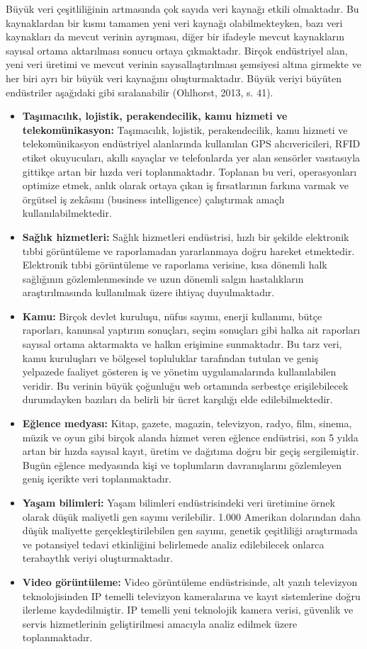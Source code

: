 \documentclass[12pt,twoside]{deuthesis}
\begin{document}
Büyük veri çeşitliliğinin artmasında çok sayıda veri kaynağı etkili olmaktadır. Bu kaynaklardan bir kısmı tamamen yeni veri kaynağı olabilmekteyken, bazı veri kaynakları da mevcut verinin ayrışması, diğer bir ifadeyle mevcut kaynakların sayısal ortama aktarılması sonucu ortaya çıkmaktadır. Birçok endüstriyel alan, yeni veri üretimi ve mevcut verinin sayısallaştırılması şemsiyesi altına girmekte ve her biri ayrı bir büyük veri kaynağını oluşturmaktadır. Büyük veriyi büyüten endüstriler aşağıdaki gibi sıralanabilir (Ohlhorst, 2013, s. 41).
\begin{itemize}
\item
  \textbf{Taşımacılık, lojistik, perakendecilik, kamu hizmeti ve telekomünikasyon:} Taşımacılık, lojistik, perakendecilik, kamu hizmeti ve telekomünikasyon endüstriyel alanlarında kullanılan GPS alıcıvericileri, RFID etiket okuyucuları, akıllı sayaçlar ve telefonlarda yer alan sensörler vasıtasıyla gittikçe artan bir hızda veri toplanmaktadır. Toplanan bu veri, operasyonları optimize etmek, anlık olarak ortaya çıkan iş fırsatlarının farkına varmak ve örgütsel iş zekâsını (business intelligence) çalıştırmak amaçlı kullanılabilmektedir.
\item
  \textbf{Sağlık hizmetleri:} Sağlık hizmetleri endüstrisi, hızlı bir şekilde elektronik tıbbi görüntüleme ve raporlamadan yararlanmaya doğru hareket etmektedir. Elektronik tıbbi görüntüleme ve raporlama verisine, kısa dönemli halk sağlığının gözlemlenmesinde ve uzun dönemli salgın hastalıkların araştırılmasında kullanılmak üzere ihtiyaç duyulmaktadır.
\item
  \textbf{Kamu:} Birçok devlet kuruluşu, nüfus sayımı, enerji kullanımı, bütçe raporları, kanunsal yaptırım sonuçları, seçim sonuçları gibi halka ait raporları sayısal ortama aktarmakta ve halkın erişimine sunmaktadır. Bu tarz veri, kamu kuruluşları ve bölgesel topluluklar tarafından tutulan ve geniş yelpazede faaliyet gösteren iş ve yönetim uygulamalarında kullanılabilen veridir. Bu verinin büyük çoğunluğu web ortamında serbestçe erişilebilecek durumdayken bazıları da belirli bir ücret karşılığı elde edilebilmektedir.
\item
  \textbf{Eğlence medyası:} Kitap, gazete, magazin, televizyon, radyo, film, sinema, müzik ve oyun gibi birçok alanda hizmet veren eğlence endüstrisi, son 5 yılda artan bir hızda sayısal kayıt, üretim ve dağıtıma doğru bir geçiş sergilemiştir. Bugün eğlence medyasında kişi ve toplumların davranışlarını gözlemleyen geniş içerikte veri toplanmaktadır.
\item
  \textbf{Yaşam bilimleri:} Yaşam bilimleri endüstrisindeki veri üretimine örnek olarak düşük maliyetli gen sayımı verilebilir. 1.000 Amerikan dolarından daha düşük maliyette gerçekleştirilebilen gen sayımı, genetik çeşitliliği araştırmada ve potansiyel tedavi etkinliğini belirlemede analiz edilebilecek onlarca terabaytlık veriyi oluşturmaktadır.
\item
  \textbf{Video görüntüleme:} Video görüntüleme endüstrisinde, alt yazılı televizyon teknolojisinden IP temelli televizyon kameralarına ve kayıt sistemlerine doğru ilerleme kaydedilmiştir. IP temelli yeni teknolojik kamera verisi, güvenlik ve servis hizmetlerinin geliştirilmesi amacıyla analiz edilmek üzere toplanmaktadır.
\end{itemize}
\end{document}
